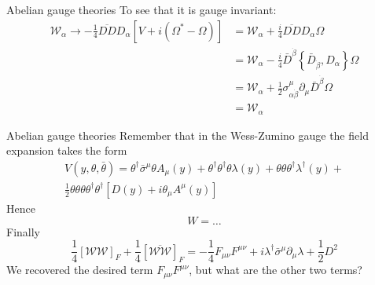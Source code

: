 \documentclass[10pt]{beamer}
\begin{document}
\begin{frame}{Abelian gauge theories}
To see that it is gauge invariant:
\begin{equation*}
\begin{aligned}
    \mathcal{W}_{\alpha} \rightarrow-\frac{1}{4} \overline{D D} D_{\alpha}\left[V+i\left(\Omega^{*}-\Omega\right)\right] &=\mathcal{W}_{\alpha}+\frac{i}{4} \overline{D D} D_{\alpha} \Omega \\
    &=\mathcal{W}_{\alpha}-\frac{i}{4} \bar{D}^{\dot{\beta}}\left\{\bar{D}_{\dot{\beta}}, D_{\alpha}\right\} \Omega \\
    &=\mathcal{W}_{\alpha}+\frac{1}{2} \sigma_{\alpha \dot{\beta}}^{\mu} \partial_{\mu} \bar{D}^{\dot{\beta}} \Omega \\
    &=\mathcal{W}_{\alpha}
\end{aligned}
\end{equation*}
\end{frame}

\begin{frame}{Abelian gauge theories}
Remember that in the Wess-Zumino gauge the field expansion takes the form 
\begin{gather*}
    V(y, \theta, \bar \theta) = \theta^{\dagger} \bar{\sigma}^{\mu} \theta A_{\mu}(y)+\theta^{\dagger} \theta^{\dagger} \theta \lambda(y)+\theta \theta \theta^{\dagger} \lambda^{\dagger}(y) + \\ 
    \frac{1}{2} \theta \theta \theta \theta^{\dagger} \theta^{\dagger}\left[D(y)+i \theta_{\mu} A^{\mu}(y)\right]
\end{gather*}
Hence 
\begin{equation*}
    W = \dots
\end{equation*}
Finally 
\begin{equation*}
    \frac{1}{4}\left[\mathcal{WW}\right]_F + \frac{1}{4} \left[\overline{\mathcal{WW}}\right]_F = -\frac{1}{4} F_{\mu\nu} F^{\mu\nu} + i \lambda^{\dagger} \bar\sigma^{\mu} \partial_{\mu} \lambda + \frac{1}{2} D^2
\end{equation*}
We recovered the desired term $F_{\mu\nu}F^{\mu\nu}$, but what are the other two terms?
\end{frame}
\end{document}
